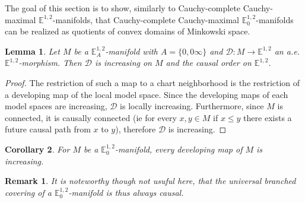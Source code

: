 \documentclass[a4paper,12pt]{article}
\newtheorem{lem}{Lemma}[section]          %
\newtheorem{cor}[lem]{Corollary}
\newtheorem{rem}{Remark}             %
\def\D{\mathcal{D}}
\def\D{\mathcal{D}}
\newcommand{\mass}[1]{{\mathbb E}^{1,2}_{#1}}
\def\D{\mathcal{D}}
\begin{document}
The goal of this section is to show, similarly to Cauchy-complete Cauchy-maximal $\mass{}$-manifolds, that Cauchy-complete Cauchy-maximal $\mass{0}$-manifolds can be realized as quotients of convex domains of Minkowski space. 

\begin{lem}\label{lem:increasing_map} Let $M$ be a  $\mass{A}$-manifold with $A=\{0,0\infty\}$ and $\D:M\rightarrow \mass{}$ an a.e. $\mass{}$-morphism. 
Then $\D$ is  increasing on $M$ and the causal order on $\mass{}$.
\end{lem}
\begin{proof} 
 The restriction of such a map to a chart neighborhood is the restriction of a developing map of the local model space. Since the developing maps of each model spaces are  increasing, $\D$ is locally increasing. Furthermore, since $M$ is connected, it is causally connected (ie for every $x,y\in M$ if $x\leq y$ there exists a future causal path from $x$ to $y$), therefore $\D$ is increasing.
 
\end{proof}
\begin{cor}\label{cor:increasing_map}
 For $M$ be a  $\mass{0}$-manifold, every developing map of $M$ is increasing.
\end{cor}
\begin{rem}\label{rem:noteworthy_though_not_usuful} It is noteworthy though not usuful here, that the universal branched covering of a $\mass{0}$-manifold is thus always causal.
\end{rem}
\end{document}
